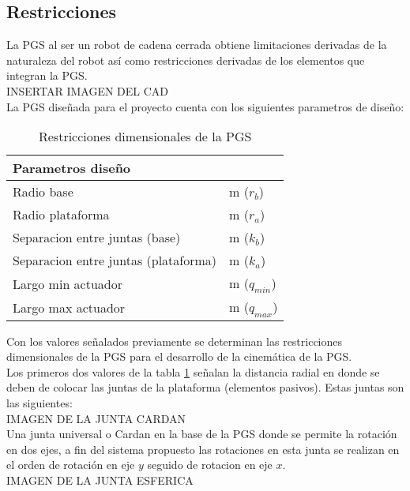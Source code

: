 \subsection{Restricciones}
La PGS al ser un robot de cadena cerrada obtiene limitaciones 
derivadas de la naturaleza del robot así como restricciones 
derivadas de los elementos que integran la PGS.\\

INSERTAR IMAGEN DEL CAD\\

La PGS diseñada para el proyecto cuenta con los siguientes 
parametros de diseño:

\begin{table}[h]\label{tab:restricciones}
\centering
\begin{tabular}{|ll|}
\hline
\multicolumn{2}{|l|}{Parametros diseño} \\ \hline
Radio base & m ($r_b$)\\ \hline
Radio plataforma & m ($r_a$)\\ \hline
Separacion entre juntas (base) & m ($k_b$)\\ \hline
Separacion entre juntas (plataforma) & m ($k_a$)\\ \hline
Largo min actuador & m ($q_{min}$)\\ \hline
Largo max actuador & m ($q_{max}$)\\ \hline
\end{tabular}
\caption{Restricciones dimensionales de la PGS}
\end{table}

Con los valores señalados previamente se determinan las restricciones 
dimensionales de la PGS para el desarrollo de la cinemática de la PGS.\\

Los primeros dos valores de la tabla \ref{tab:restricciones} señalan 
la distancia radial en donde se deben de colocar las juntas de la 
plataforma (elementos pasivos). Estas juntas son las siguientes:\\

IMAGEN DE LA JUNTA CARDAN\\

Una junta universal o Cardan en la base de la PGS donde se permite la 
rotación en dos ejes, a fin del sistema propuesto las rotaciones en esta junta 
se realizan en el orden de rotación en eje $y$ seguido de rotacion en eje $x$.\\

IMAGEN DE LA JUNTA ESFERICA\\

